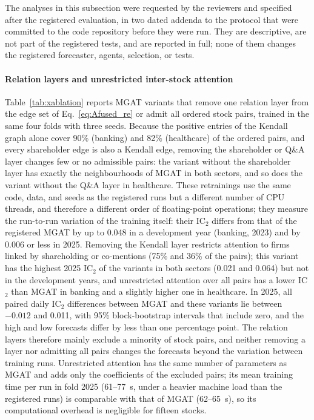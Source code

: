 \documentclass[pdflatex,sn-mathphys-num]{sn-jnl}%
\theoremstyle{thmstyleone}%
\theoremstyle{thmstyletwo}%
\theoremstyle{thmstylethree}%
\begin{document}
{\color{blue}The analyses in this subsection were requested by the reviewers and specified after the registered evaluation, in two dated addenda to the protocol that were committed to the code repository before they were run. They are descriptive, are not part of the registered tests, and are reported in full; none of them changes the registered forecaster, agents, selection, or tests.

\paragraph{Relation layers and unrestricted inter-stock attention}
Table~\ref{tab:xablation} reports MGAT variants that remove one relation layer from the edge set of Eq.~\eqref{eq:Afused_re} or admit all ordered stock pairs, trained in the same four folds with three seeds. Because the positive entries of the Kendall graph alone cover 90\% (banking) and 82\% (healthcare) of the ordered pairs, and every shareholder edge is also a Kendall edge, removing the shareholder or Q\&A layer changes few or no admissible pairs: the variant without the shareholder layer has exactly the neighbourhoods of MGAT in both sectors, and so does the variant without the Q\&A layer in healthcare. These retrainings use the same code, data, and seeds as the registered runs but a different number of CPU threads, and therefore a different order of floating-point operations; they measure the run-to-run variation of the training itself: their IC$_2$ differs from that of the registered MGAT by up to 0.048 in a development year (banking, 2023) and by 0.006 or less in 2025. Removing the Kendall layer restricts attention to firms linked by shareholding or co-mentions (75\% and 36\% of the pairs); this variant has the highest 2025 IC$_2$ of the variants in both sectors (0.021 and 0.064) but not in the development years, and unrestricted attention over all pairs has a lower IC$_2$ than MGAT in banking and a slightly higher one in healthcare. In 2025, all paired daily IC$_2$ differences between MGAT and these variants lie between $-0.012$ and 0.011, with 95\% block-bootstrap intervals that include zero, and the high and low forecasts differ by less than one percentage point. The relation layers therefore mainly exclude a minority of stock pairs, and neither removing a layer nor admitting all pairs changes the forecasts beyond the variation between training runs. Unrestricted attention has the same number of parameters as MGAT and adds only the coefficients of the excluded pairs; its mean training time per run in fold 2025 (61--77~s, under a heavier machine load than the registered runs) is comparable with that of MGAT (62--65~s), so its computational overhead is negligible for fifteen stocks.

}
\end{document}
